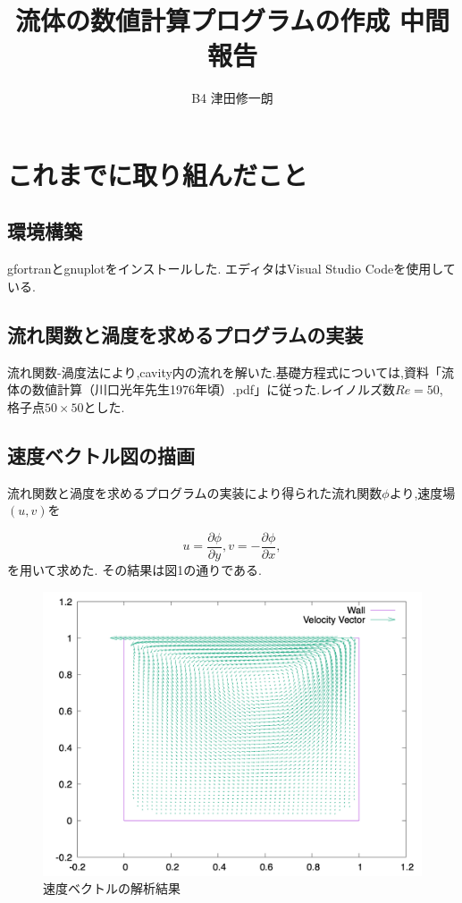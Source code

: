 \documentclass[upLaTeX,a4paper]{jsarticle}
\title{流体の数値計算プログラムの作成 中間報告}
\author{B4 津田修一朗}
\date{}
\begin{document}
\maketitle

\section{これまでに取り組んだこと}
\subsection{環境構築}
gfortranとgnuplotをインストールした.
エディタはVisual Studio Codeを使用している.

\subsection{流れ関数と渦度を求めるプログラムの実装}
流れ関数-渦度法により,cavity内の流れを解いた.基礎方程式については,資料「流体の数値計算（川口光年先生1976年頃）.pdf」に従った.レイノルズ数$Re = 50$, 格子点$50\times 50$とした.

\subsection{速度ベクトル図の描画}
流れ関数と渦度を求めるプログラムの実装により得られた流れ関数$\phi$より,速度場$(u, v)$を

\begin{equation}
  u = \frac{\partial \phi}{\partial y}, v = - \frac{\partial \phi}{\partial x},
\end{equation}
を用いて求めた.
その結果は図1の通りである.
\begin{figure}[htbp]
  \includegraphics[width=15cm]{outputs/img/velocity_vector_50.png}
  \caption{速度ベクトルの解析結果}
  \label{velocity_vector}
\end{figure}
\end{document}
